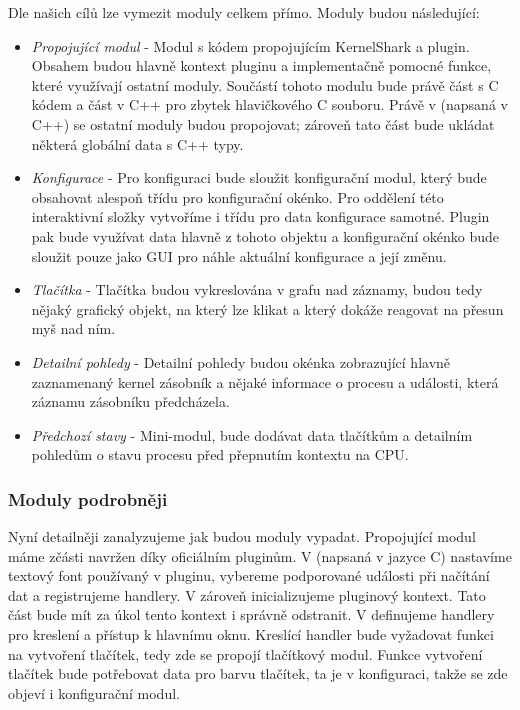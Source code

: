 Dle našich cílů lze vymezit moduly celkem přímo. Moduly budou následující:
\begin{itemize}
    \item \emph{Propojující modul} - Modul s kódem propojujícím KernelShark a plugin. Obsahem budou hlavně kontext pluginu a implementačně pomocné funkce, které využívají ostatní moduly. Součástí tohoto modulu bude právě část s C kódem a část v C++ pro zbytek hlavičkového C souboru. Právě v  (napsaná v C++) se ostatní moduly budou propojovat; zároveň tato část bude ukládat některá globální data s C++ typy.
    \item \emph{Konfigurace} - Pro konfiguraci bude sloužit konfigurační modul, který bude obsahovat alespoň třídu pro konfigurační okénko. Pro oddělení této interaktivní složky vytvoříme i třídu pro data konfigurace samotné. Plugin pak bude využívat data hlavně z tohoto objektu a konfigurační okénko bude sloužit pouze jako GUI pro náhle aktuální konfigurace a její změnu.
    \item \emph{Tlačítka} - Tlačítka budou vykreslována v grafu nad záznamy, budou tedy nějaký grafický objekt, na který lze klikat a který dokáže reagovat na přesun myš nad ním.
    \item \emph{Detailní pohledy} - Detailní pohledy budou okénka zobrazující hlavně zaznamenaný kernel zásobník a nějaké informace o procesu a události, která záznamu zásobníku předcházela.
    \item \emph{Předchozí stavy} - Mini-modul, bude dodávat data tlačítkům a detailním pohledům o stavu procesu před přepnutím kontextu na CPU. 
\end{itemize}

\subsubsection*{Moduly podrobněji}

Nyní detailněji zanalyzujeme jak budou moduly vypadat. Propojující modul máme zčásti navržen díky oficiálním pluginům. V  (napsaná v jazyce C) nastavíme textový font používaný v pluginu, vybereme podporované události při načítání dat a registrujeme handlery. V  zároveň inicializujeme pluginový kontext. Tato část bude mít za úkol tento kontext i správně odstranit. V  definujeme handlery pro kreslení a přístup k hlavnímu oknu. Kreslící handler bude vyžadovat funkci na vytvoření tlačítek, tedy zde se propojí tlačítkový modul. Funkce vytvoření tlačítek bude potřebovat data pro barvu tlačítek, ta je v konfiguraci, takže se zde objeví i konfigurační modul.

